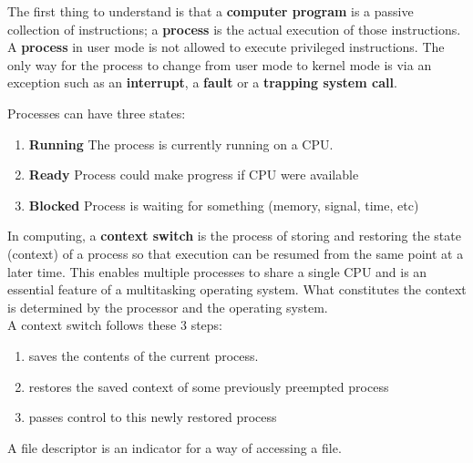 



The first thing to understand is that a {\bf computer program} is a passive collection of instructions; a {\bf process} is the actual execution of those instructions.\\

A {\bf process} in user mode is not allowed to execute privileged instructions.  The only way for the process to change from user mode to kernel mode is via an exception such as an {\bf interrupt}, a {\bf fault} or a {\bf trapping system call}.


Processes can have three states:
\begin{enumerate}
\item  {\bf Running}  The process is currently running on a CPU.
\item {\bf Ready} Process could make progress if CPU were available
\item  {\bf Blocked} Process is waiting for something (memory, signal, time, etc)
\end{enumerate}




In computing, a {\bf context switch} is the process of storing and restoring the state (context) of a process so that execution can be resumed from the same point at a later time. This enables multiple processes to share a single CPU and is an essential feature of a multitasking operating system. What constitutes the context is determined by the processor and the operating system.\\

A context switch follows these 3 steps:

\begin{enumerate}
\item   saves the contents of the current process.
\item  restores the saved context of some previously preempted process
\item  passes control to this newly restored process
\end{enumerate}



A file descriptor is an indicator for a way of accessing a file.


